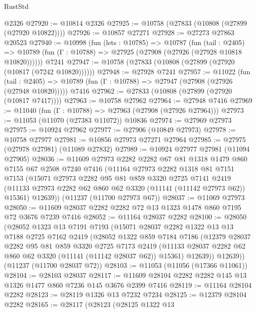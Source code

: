 \begin{lexlean}{RustStd}
\begin{coremodule}
    @2326
@27920 := @10814 @2326
@27925 := @10758 (@27833 (@10808 (@27899 (@27920 @10822))))
@27926 := @10857 @27271
@27928 := @27273 @27863 @20523
@27940 := @10998
    (fun (lets : @10785) =>
    @10787
      (fun (tail : @2405) =>
      @10789 (fun (Γ : @10788) => @27925 (@27908 (@27926 (@27928 @10818 @10820))))))
    @7241
@27947 := @10758 (@27833 (@10808 (@27899 (@27920 (@10817 (@7242 @10820))))))
@27948 := @27928 @7241
@27957 := @11022
    (fun (tail : @2405) => @10789 (fun (Γ : @10788) => @27947 (@27908 (@27926 (@27948 @10820)))))
    @7416
@27962 := @27833 (@10808 (@27899 (@27920 (@10817 @7417))))
@27963 := @10758 @27962
@27964 := @27948 @7416
@27969 := @11040 (fun (Γ : @10788) => @27963 (@27908 (@27926 @27964)))
@27973 := @11053 (@11070 (@27383 @11072)) @10836
@27974 := @27969 @27973
@27975 := @10924 @27962
@27977 := @27906 (@10849 @27973)
@27978 := @10758 @27977
@27981 := @10856 @27973 @27271 @27964
@27985 := @27975 (@27978 @27981) (@11089 @27832)
@27989 := @10924 @27977 @27981 (@11094 @27905)
@28036 := @11609
    @27973
    @2282
    @2282
    @67
    @81
    @1318
    @1479
    @860
    @7155
    @67
    @2508
    @7240
    @7416
    (@11164
      @27973
      @2282
      @1318
      @81
      @7151
      @7153
      (@15071
        @27973
        @2282
        @95
        @81
        @859
        @3320
        @2725
        @7141
        @2419
        (@11133 @27973 @2282 @62 @860 @62 @3320 (@11141 (@11142 @27973 @62)) @15361)
        @12639))
    (@11237 (@11700 @27973 @67))
@28037 := @11069 @27973
@28050 := @11609 @28037 @2282 @2282 @72 @13 @1323 @1478 @860 @7195 @72 @3676 @7239 @7416
@28052 := @11164 @28037 @2282
@28100 := @28050
    (@28052
      @1323
      @13
      @7191
      @7193
      (@15071
        @28037
        @2282
        @1322
        @13
        @13
        @7188
        @2725
        @7162
        @2419
        (@28052
          @1322
          @859
          @7184
          @7186
          (@12379
            @28037
            @2282
            @95
            @81
            @859
            @3320
            @2725
            @7173
            @2419
            (@11133 @28037 @2282 @62 @860 @62 @3320 (@11141 (@11142 @28037 @62)) @15361)
            @12639))
        @12639))
    (@11237 (@11700 @28037 @72))
@28103 := @11053 (@11056 (@17366 @11061))
@28104 := @28103 @28037
@28117 := @11609 @28104 @2282 @2282 @145 @13 @1326 @1477 @860 @7236 @145 @3676 @2399 @7416
@28119 := @11164 @28104 @2282
@28123 := @28119 @1326 @13 @7232 @7234
@28125 := @12379 @28104 @2282
@28165 := @28117
    (@28123
      (@28125
        @1322
        @13

\end{coremodule}
\end{lexlean}
